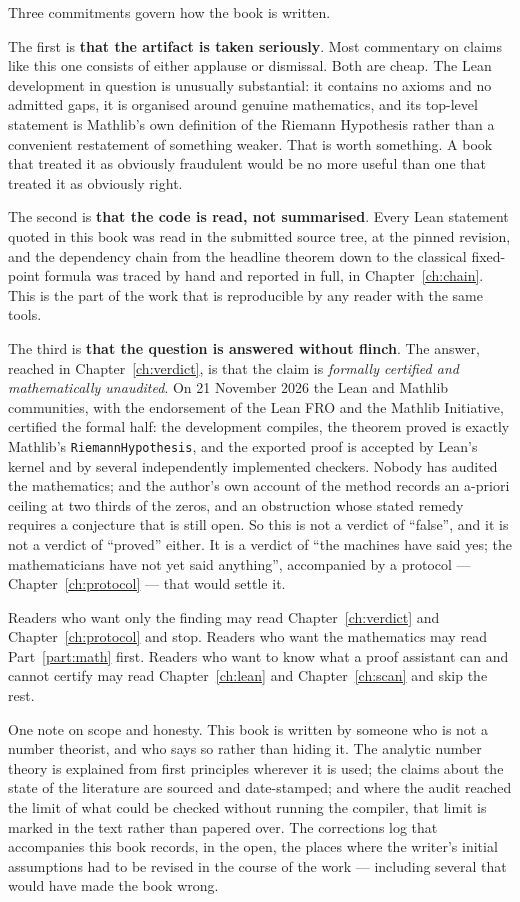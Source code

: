 Three commitments govern how the book is written.

The first is \textbf{that the artifact is taken seriously}. Most commentary on
claims like this one consists of either applause or dismissal. Both are cheap.
The Lean development in question is unusually substantial: it contains no axioms
and no admitted gaps, it is organised around genuine mathematics, and its
top-level statement is Mathlib's own definition of the Riemann Hypothesis
rather than a convenient restatement of something weaker. That is worth
something. A book that treated it as obviously fraudulent would be no more
useful than one that treated it as obviously right.

The second is \textbf{that the code is read, not summarised}. Every Lean
statement quoted in this book was read in the submitted source tree, at the
pinned revision, and the dependency chain from the headline theorem down to the
classical fixed-point formula was traced by hand and reported in full, in
Chapter~\ref{ch:chain}. This is the part of the work that is reproducible by any reader with
the same tools.

The third is \textbf{that the question is answered without flinch}. The answer,
reached in Chapter~\ref{ch:verdict}, is that the claim is \emph{formally
certified and mathematically unaudited}. On 21 November 2026 the Lean and
Mathlib communities, with the endorsement of the Lean FRO and the Mathlib
Initiative, certified the formal half: the development compiles, the theorem
proved is exactly Mathlib's \texttt{RiemannHypothesis}, and the exported proof
is accepted by Lean's kernel and by several independently implemented
checkers. Nobody has audited the mathematics; and the author's own account of
the method records an a-priori ceiling at two thirds of the zeros, and an
obstruction whose stated remedy requires a conjecture that is still open. So
this is not a verdict of ``false'', and it is not a verdict of ``proved''
either. It is a verdict of ``the machines have said yes; the mathematicians
have not yet said anything'', accompanied by a protocol ---
Chapter~\ref{ch:protocol} --- that would settle it.

Readers who want only the finding may read Chapter~\ref{ch:verdict} and Chapter~\ref{ch:protocol} and stop.
Readers who want the mathematics may read Part~\ref{part:math} first. Readers who want to
know what a proof assistant can and cannot certify may read Chapter~\ref{ch:lean} and
Chapter~\ref{ch:scan} and skip the rest.

One note on scope and honesty. This book is written by someone who is not a
number theorist, and who says so rather than hiding it. The analytic number
theory is explained from first principles wherever it is used; the claims about
the state of the literature are sourced and date-stamped; and where the audit
reached the limit of what could be checked without running the compiler, that
limit is marked in the text rather than papered over. The corrections log that
accompanies this book records, in the open, the places where the writer's
initial assumptions had to be revised in the course of the work --- including
several that would have made the book wrong.

